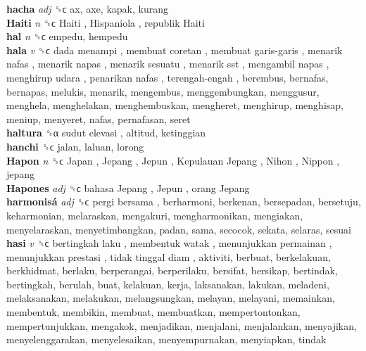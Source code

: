 \textbf{hacha} \emph{adj}  ␝ϲ  ax, axe, kapak, kurang  \\
\textbf{Haiti} \emph{n}  ␝ϲ   Haiti ,  Hispaniola ,  republik Haiti   \\
\textbf{hal} \emph{n}  ␝ϲ  empedu, hempedu  \\
\textbf{hala} \emph{v}  ␝ϲ   dada menampi ,  membuat coretan ,  membuat garis-garis ,  menarik nafas ,  menarik napas ,  menarik sesuatu ,  menarik sst ,  mengambil napas ,  menghirup udara ,  penarikan nafas ,  terengah-engah , berembus, bernafas, bernapas, melukis, menarik, mengembus, menggembungkan, menggusur, menghela, menghelakan, menghembuskan, mengheret, menghirup, menghisap, meniup, menyeret, nafas, pernafasan, seret  \\
\textbf{haltura} ␝α   sudut elevasi , altitud, ketinggian  \\
\textbf{hanchi} ␝ϲ  jalan, laluan, lorong  \\
\textbf{Hapon} \emph{n}  ␝ϲ   Japan ,  Jepang ,  Jepun ,  Kepulauan Jepang ,  Nihon ,  Nippon , jepang  \\
\textbf{Hapones} \emph{adj}  ␝ϲ   bahasa Jepang ,  Jepun ,  orang Jepang   \\
\textbf{harmonisá} \emph{adj}  ␝ϲ   pergi bersama , berharmoni, berkenan, bersepadan, bersetuju, keharmonian, melaraskan, mengakuri, mengharmonikan, mengiakan, menyelaraskan, menyetimbangkan, padan, sama, secocok, sekata, selaras, sesuai  \\
\textbf{hasi} \emph{v}  ␝ϲ   bertingkah laku ,  membentuk watak ,  menunjukkan permainan ,  menunjukkan prestasi ,  tidak tinggal diam , aktiviti, berbuat, berkelakuan, berkhidmat, berlaku, berperangai, berperilaku, bersifat, bersikap, bertindak, bertingkah, berulah, buat, kelakuan, kerja, laksanakan, lakukan, meladeni, melaksanakan, melakukan, melangsungkan, melayan, melayani, memainkan, membentuk, membikin, membuat, membuatkan, mempertontonkan, mempertunjukkan, mengakok, menjadikan, menjalani, menjalankan, menyajikan, menyelenggarakan, menyelesaikan, menyempurnakan, menyiapkan, tindak  \\
